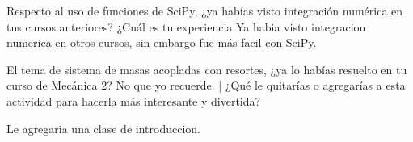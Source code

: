 \documentclass[a4paper]{article}
\begin{document}
    Respecto al uso de funciones de SciPy, ¿ya habías visto integración numérica en tus cursos anteriores? ¿Cuál es tu experiencia
    \linebreak
    Ya habia visto integracion numerica en otros cursos, sin embargo fue más facil con SciPy.
    \linebreak
   
    
    El tema de sistema de masas acopladas con resortes, ¿ya lo habías resuelto en tu curso de Mecánica 2? 
    \linebreak
    No que yo recuerde.
    \linebreak|
    ¿Qué le quitarías o agregarías a esta actividad para hacerla más interesante y divertida? 
    
    Le agregaria una clase de introduccion.
\end{document}
